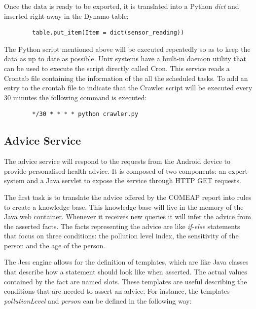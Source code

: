 Once the data is ready to be exported, it is translated into a Python \textit{dict} and inserted right-away in the Dynamo table: \bigskip

{\centering
\begin{BVerbatim}
        table.put_item(Item = dict(sensor_reading))
\end{BVerbatim}
\par
}\bigskip


The Python script mentioned above will be executed repeatedly so as to keep the data as up to date as possible. Unix systems have a built-in daemon utility that can be used to execute the script directly called Cron. This service reads a Crontab file containing the information of the all the scheduled tasks. To add an entry to the crontab file to indicate that the Crawler script will be executed every 30 minutes the following command is executed: \bigskip

{\centering
\begin{BVerbatim}
        */30 * * * * python crawler.py
\end{BVerbatim}
\par
}

\subsection{Advice Service}
The advice service will respond to the requests from the Android device to provide personalised health advice. It is composed of two components: an expert system and a Java servlet to expose the service through HTTP GET requests. 

The first task is to translate the advice offered by the COMEAP report into rules to create a knowledge base. This knowledge base will live in the memory of the Java web container. Whenever it receives new queries it will infer the advice from the asserted facts. The facts representing the advice are like \textit{if-else} statements that focus on three conditions: the pollution level index, the sensitivity of the person and the age of the person. 

The Jess engine allows for the definition of templates, which are like Java classes that describe how a statement should look like when asserted. The actual values contained by the fact are named slots. These templates are useful describing the conditions that are needed to assert an advice. For instance, the templates \textit{pollutionLevel} and \textit{person} can be defined in the following way: 

